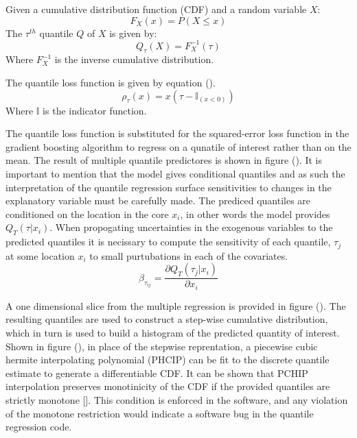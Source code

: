 Given a cumulative distribution function (CDF) and a random variable $X$:
\begin{equation}
F_X(x) = P(X \leq x)
\end{equation}
The $\tau^{th}$ quantile $Q$ of $X$ is given by:
\begin{equation}
Q_\tau(X) = F_X^{-1}(\tau)
\end{equation}
Where $F_X^{-1}$ is the inverse cumulative distribution.

The quantile loss function is given by equation ().
\begin{equation}
\rho_\tau(x) = x(\tau - \mathbb{I}_{(x < 0)})
\end{equation}
Where $\mathbb{I}$ is the indicator function.

The quantile loss function is substituted for the squared-error loss function in the gradient boosting algorithm to regress on a qunatile of interest rather than on the mean.  The result of multiple quantile predictores is shown in figure ().  It is important to mention that the model gives conditional quantiles and as such the interpretation of the quantile regression surface sensitivities to changes in the explanatory variable must be carefully made.  The prediced quantiles are conditioned on the location in the core $x_i$, in other words the model provides $Q_T(\tau|x_i)$.  When propogating uncertainties in the exogenous variables to the predicted quantiles it is necissary to compute the sensitivity of each quantile, $\tau_j$ at some location $x_i$ to small purtubations in each of the covariates.
\begin{equation}
\beta_{\tau_{ij}} = \frac{\partial Q_T(\tau_j|x_i)}{\partial x_i}
\end{equation}

A one dimensional slice from the multiple regression is provided in figure ().
The resulting quantiles are used to construct a step-wise cumulative distribution, which in turn is used to build a histogram of the predicted quantity of interest. \\

Shown in figure (), in place of the stepwise reprentation, a piecewise cubic hermite interpolating polynomial (PHCIP) can be fit to the discrete quantile estimate to generate a differentiable CDF.
It can be shown that PCHIP interpolation preserves monotinicity of the CDF if the provided quantiles are strictly monotone [].  This condition is enforced in the software, and any violation of the monotone restriction would indicate a software bug in the quantile regression code.
